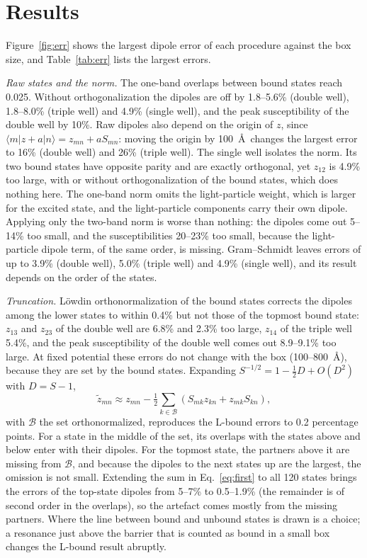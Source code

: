 \documentclass[11pt]{article}
\begin{document}
\section{Results}
Figure~\ref{fig:err} shows the largest dipole error of each procedure against the box size, and Table~\ref{tab:err} lists the largest errors.

\emph{Raw states and the norm.} The one-band overlaps between bound states reach 0.025. Without orthogonalization the dipoles are off by 1.8--5.6\% (double well), 1.8--8.0\% (triple well) and 4.9\% (single well), and the peak susceptibility of the double well by 10\%. Raw dipoles also depend on the origin of $z$, since $\langle m|z+a|n\rangle=z_{mn}+aS_{mn}$: moving the origin by 100~\AA\ changes the largest error to 16\% (double well) and 26\% (triple well). The single well isolates the norm. Its two bound states have opposite parity and are exactly orthogonal, yet $z_{12}$ is 4.9\% too large, with or without orthogonalization of the bound states, which does nothing here. The one-band norm omits the light-particle weight, which is larger for the excited state, and the light-particle components carry their own dipole. Applying only the two-band norm is worse than nothing: the dipoles come out 5--14\% too small, and the susceptibilities 20--23\% too small, because the light-particle dipole term, of the same order, is missing. Gram--Schmidt leaves errors of up to 3.9\% (double well), 5.0\% (triple well) and 4.9\% (single well), and its result depends on the order of the states.

\emph{Truncation.} L\"owdin orthonormalization of the bound states corrects the dipoles among the lower states to within 0.4\% but not those of the topmost bound state: $z_{13}$ and $z_{23}$ of the double well are 6.8\% and 2.3\% too large, $z_{14}$ of the triple well 5.4\%, and the peak susceptibility of the double well comes out 8.9--9.1\% too large. At fixed potential these errors do not change with the box (100--800~\AA), because they are set by the bound states. Expanding $S^{-1/2}=1-\tfrac12D+O(D^2)$ with $D=S-1$,
\begin{equation}
\tilde z_{mn}\approx z_{mn}-\tfrac12\sum_{k\in\mathcal B}\left(S_{mk}z_{kn}+z_{mk}S_{kn}\right),
\label{eq:first}
\end{equation}
with $\mathcal B$ the set orthonormalized, reproduces the L-bound errors to 0.2 percentage points. For a state in the middle of the set, its overlaps with the states above and below enter with their dipoles. For the topmost state, the partners above it are missing from $\mathcal B$, and because the dipoles to the next states up are the largest, the omission is not small. Extending the sum in Eq.~\eqref{eq:first} to all 120 states brings the errors of the top-state dipoles from 5--7\% to 0.5--1.9\% (the remainder is of second order in the overlaps), so the artefact comes mostly from the missing partners. Where the line between bound and unbound states is drawn is a choice; a resonance just above the barrier that is counted as bound in a small box changes the L-bound result abruptly.
\end{document}
